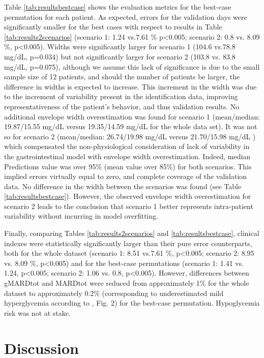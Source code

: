 Table \ref{tab:resultsbestcase} shows the evaluation metrics for the best-case permutation for each patient. As expected, errors for the validation days were significantly smaller for the best cases with respect to results in Table \ref{tab:results2scenarios} (scenario 1: 1.24 vs.7.61 \% p<0.005; scenario 2: 0.8 vs. 8.09 \%, p<0.005). Widths were significantly larger for scenario 1 (104.6 vs.78.8 mg/dL, p=0.034) but not significantly larger for scenario 2 (103.8 vs. 83.8 mg/dL, p=0.075), although we assume this lack of significance is due to the small sample size of 12 patients, and should the number of patients be larger, the difference in widths is expected to increase. This increment in the width was due to the increment of variability present in the identification data, improving representativeness of the patient's behavior, and thus validation results. No additional envelope width overestimation was found for scenario 1 (mean/median:  19.87/15.55 mg/dL versus 19.35/14.59 mg/dL for the whole data set). It was not so for scenario 2 (mean/median:  26.74/19.98 mg/dL versus 21.70/15.98 mg/dL ) which compensated the non-physiological consideration of lack of variability in the gastrointestinal model with envelope width overestimation. Indeed, median Predictions value was over 95\% (mean value over 85\%) for both scenarios. This implied errors virtually equal to zero, and complete coverage of the validation data. No difference in the width between the scenarios was found (see Table \ref{tab:resultsbestcase}). However, the observed envelope width overestimation for scenario 2 leads to the conclusion that scenario 1 better represents intra-patient variability without incurring in model overfitting.

Finally, comparing Tables \ref{tab:results2scenarios} and \ref{tab:resultsbestcase}, clinical indexes were statistically significantly larger than their pure error counterparts, both for the whole dataset (scenario 1: 8.51 vs.7.61 \%, p<0.005; scenario 2: 8.95 vs. 8.09 \%, p<0.005) and for the best-case permutations (scenario 1: 1.41 vs. 1.24, p<0.005; scenario 2: 1.06 vs. 0.8, p<0.005). However, differences between gMARDtot and MARDtot were reduced from approximately 1\% for the whole dataset to approximately 0.2\% (corresponding to underestimated mild hyperglycemia according to \cite{del2012glucose}, Fig. 2) for the best-case permutation. Hypoglycemia risk was not at stake.

\section{Discussion}
\label{sec:Discussionip}
	
